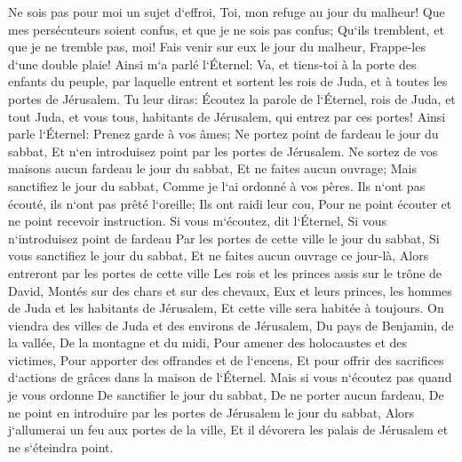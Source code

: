 \verse Ne sois pas pour moi un sujet d`effroi, Toi, mon refuge au jour du malheur! 
\verse Que mes persécuteurs soient confus, et que je ne sois pas confus; Qu`ils tremblent, et que je ne tremble pas, moi! Fais venir sur eux le jour du malheur, Frappe-les d`une double plaie! 
\verse Ainsi m`a parlé l`Éternel: Va, et tiens-toi à la porte des enfants du peuple, par laquelle entrent et sortent les rois de Juda, et à toutes les portes de Jérusalem. 
\verse Tu leur diras: Écoutez la parole de l`Éternel, rois de Juda, et tout Juda, et vous tous, habitants de Jérusalem, qui entrez par ces portes! 
\verse Ainsi parle l`Éternel: Prenez garde à vos âmes; Ne portez point de fardeau le jour du sabbat, Et n`en introduisez point par les portes de Jérusalem. 
\verse Ne sortez de vos maisons aucun fardeau le jour du sabbat, Et ne faites aucun ouvrage; Mais sanctifiez le jour du sabbat, Comme je l`ai ordonné à vos pères. 
\verse Ils n`ont pas écouté, ils n`ont pas prêté l`oreille; Ils ont raidi leur cou, Pour ne point écouter et ne point recevoir instruction. 
\verse Si vous m`écoutez, dit l`Éternel, Si vous n`introduisez point de fardeau Par les portes de cette ville le jour du sabbat, Si vous sanctifiez le jour du sabbat, Et ne faites aucun ouvrage ce jour-là, 
\verse Alors entreront par les portes de cette ville Les rois et les princes assis sur le trône de David, Montés sur des chars et sur des chevaux, Eux et leurs princes, les hommes de Juda et les habitants de Jérusalem, Et cette ville sera habitée à toujours. 
\verse On viendra des villes de Juda et des environs de Jérusalem, Du pays de Benjamin, de la vallée, De la montagne et du midi, Pour amener des holocaustes et des victimes, Pour apporter des offrandes et de l`encens, Et pour offrir des sacrifices d`actions de grâces dans la maison de l`Éternel. 
\verse Mais si vous n`écoutez pas quand je vous ordonne De sanctifier le jour du sabbat, De ne porter aucun fardeau, De ne point en introduire par les portes de Jérusalem le jour du sabbat, Alors j`allumerai un feu aux portes de la ville, Et il dévorera les palais de Jérusalem et ne s`éteindra point. 

